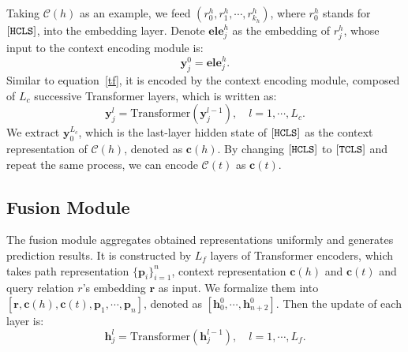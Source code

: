 \documentclass{article}
\begin{document}
Taking $\mathcal{C}(h)$ as an example, we feed $(r^h_0,r^h_1, \cdots, r^h_{k_h})$, where $r^h_0$ stands for ${\small\tt [HCLS]}$, into the embedding layer.
Denote $\mathbf{ele}^{h}_j$ as the embedding of $r^h_j$, whose input to the context encoding module is:
\begin{equation}
    \mathbf{y}^{0}_j = \mathbf{ele}^{h}_j.
\end{equation}
Similar to equation~\ref{tf}, 
it is encoded by the context encoding module, composed of $L_c$ successive Transformer layers, which is written as:
 \begin{equation}
 \label{tf_context}
     \mathbf{y}^{l}_j = \mathrm{Transformer}(\mathbf{y}^{l-1}_j),\quad l=1,\cdots,L_c.
 \end{equation}
We extract $\mathbf{y}^{L_c}_0$, which is the last-layer hidden state of ${\small\tt [HCLS]}$ as the context representation of $\mathcal{C}(h)$, denoted as $\mathbf{c}(h)$.
By changing ${\small\tt [HCLS]}$ to ${\small\tt [TCLS]}$ and repeat the same process, we can encode $\mathcal{C}(t)$ as $\mathbf{c}(t)$.
 
 
 \subsection{Fusion Module}
 The fusion module aggregates obtained representations uniformly and generates prediction results.
It is constructed by $L_f$ layers of Transformer encoders, which takes 
path representation $\{\mathbf{p}_i\}_{i=1}^n$, context representation $\mathbf{c}(h)$ and $\mathbf{c}(t)$ and query relation $r$'s embedding $\mathbf{r}$ as input.
We formalize them into $[\mathbf{r},\mathbf{c}(h),\mathbf{c}(t),\mathbf{p}_1,\cdots,\mathbf{p}_n]$, denoted as $[\mathbf{h}^{0}_0,\cdots,\mathbf{h}^{0}_{n+2}]$.
Then the update of each layer is:
 \begin{equation}
 \label{tf_context}
     \mathbf{h}^{l}_j = \mathrm{Transformer}(\mathbf{h}^{l-1}_j),\quad l=1,\cdots,L_f.
 \end{equation}
\end{document}
